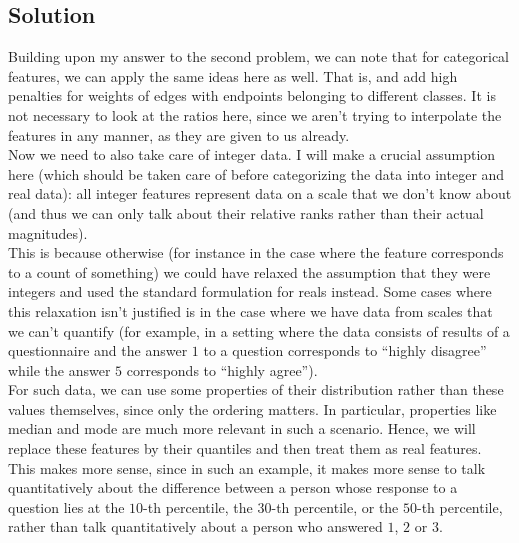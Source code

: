 \documentclass[a4paper]{article}
\newcommand{\nl}{\vspace{0.2cm}\\}
\begin{document}
\subsection{Solution}

Building upon my answer to the second problem, we can note that for categorical features, we can apply the same ideas here as well. That is,
and add high penalties for weights of edges with endpoints belonging to different classes. It is not necessary to look at the ratios here, since we aren't trying to interpolate the features in
any manner, as they are given to us already.\nl
Now we need to also take care of integer data. I will make a crucial
assumption here (which should be taken care of before categorizing the data into integer and real data): all integer features represent data on a scale that we don't know about (and thus we can only talk
about their relative ranks rather than their actual magnitudes).\nl
This is because otherwise (for instance in the case where the feature corresponds to a count of something) we could have relaxed the
assumption that they were integers and used the standard formulation for reals instead. Some cases where this relaxation isn't justified is in the case where we have data from scales that
we can't quantify (for example, in a setting where the data consists of results of a questionnaire and the answer $1$ to a question corresponds to ``highly disagree'' while the answer $5$
corresponds to ``highly agree'').\nl
For such data, we can use some properties of their distribution rather than these values themselves, since only the ordering matters. In particular, properties like median and mode are much
more relevant in such a scenario. Hence, we will replace these features by their quantiles and then treat them as real features. This makes more sense, since in such an example, it makes more
sense to talk quantitatively about the difference between a person whose
response to a question lies at the $10$-th percentile, the $30$-th percentile, or the $50$-th percentile, rather than talk quantitatively about a person who answered $1$, $2$ or $3$.\nl

\end{document}
